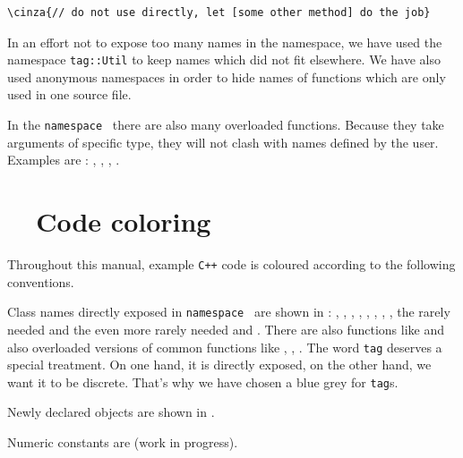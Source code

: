 \begin{Verbatim}[commandchars=\\\{\},formatcom=\small\tt,baselinestretch=0.94]
   \cinza{// do not use directly, let [some other method] do the job}
\end{Verbatim}

In an effort not to expose too many names in the {\small\tt{}} namespace, we have
used the namespace {\small\tt\textcolor{tag}{tag}::Util} to keep names which did not fit elsewhere.
We have also used anonymous namespaces in order to hide names of functions which are
only used in one source file.

In the {\small\tt namespace } there are also many overloaded functions.
Because they take arguments of specific type, they will not clash with names defined
by the user.
Examples are : {\small\tt{}}, {\small\tt{}}, {\small\tt{}},
{\small\tt{}}.


\section{~~Code coloring}\label{\numb section 11.\numb parag 2}

Throughout this manual, example {\tt C++} code is coloured according to the following
conventions.

Class names directly exposed in {\small\tt namespace } are shown in  :
{\small\tt {}}, {\small\tt {}}, {\small\tt {}},
{\small\tt {}}, {\small\tt {}},
{\small\tt {}}, {\small\tt {}},
{\small\tt {}}, the rarely needed {\small\tt {}} and
the even more rarely needed {\small\tt {}} and {\small\tt{}}.
There are also functions like {\small\tt {}} and also overloaded versions
of common functions like {\small\tt{}}, {\small\tt {}}, {\small\tt {}}.
The word {\small\tt \textcolor{tag}{tag}} deserves a special treatment.
On one hand, it is directly exposed, on the other hand, we want it to be discrete.
That's why we have chosen a \textcolor{tag}{blue grey} for {\small\tt \textcolor{tag}{tag}}s.

Newly declared objects are shown in .

Numeric constants are  (work in progress).

